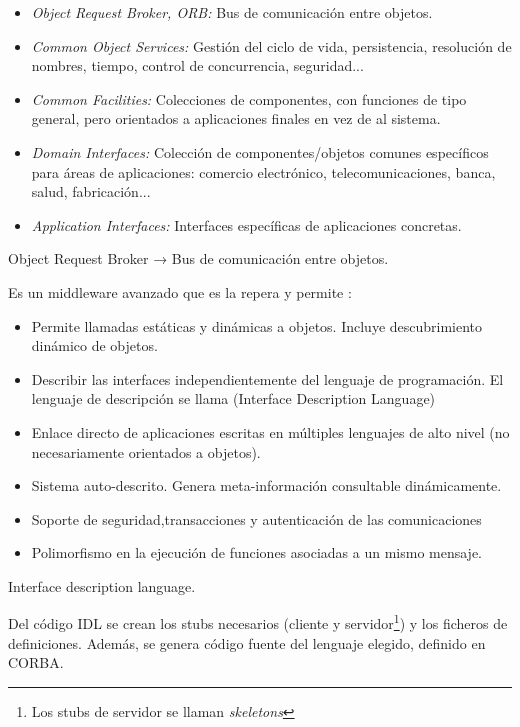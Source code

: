 \begin{itemize}
	\item \textit{Object Request Broker, ORB:} Bus de comunicación entre objetos.
	\item \textit{Common Object Services:} Gestión del ciclo de vida, persistencia, resolución de nombres, tiempo, control de concurrencia, seguridad...
	\item \textit{Common Facilities:} Colecciones de componentes, con funciones de tipo general, pero orientados a aplicaciones finales en vez de al sistema.
	\item \textit{Domain Interfaces:} Colección de componentes/objetos comunes específicos para áreas de aplicaciones: comercio electrónico, telecomunicaciones, banca, salud, fabricación...
	\item \textit{Application Interfaces:} Interfaces específicas de aplicaciones concretas.
\end{itemize}

\begin{defn}[ORB]
Object Request Broker → Bus de comunicación entre objetos.

Es un middleware avanzado que es la repera y permite :

\begin{itemize}
	\item Permite llamadas estáticas y dinámicas a objetos. Incluye descubrimiento dinámico de objetos.
	\item Describir las interfaces independientemente del lenguaje de programación. El lenguaje de descripción se llama \label{IDL} (Interface Description Language)
	\item Enlace directo de aplicaciones escritas en múltiples lenguajes de alto nivel (no necesariamente orientados a objetos).
	\item Sistema auto-descrito. Genera meta-información consultable dinámicamente.
	\item Soporte de seguridad,transacciones y autenticación de las comunicaciones
	\item Polimorfismo en la ejecución de funciones asociadas a un mismo mensaje.
\end{itemize}
\end{defn}

\begin{defn}[IDL]
Interface description language.
\end{defn}

Del código IDL se crean los stubs necesarios (cliente y servidor\footnote{Los stubs de servidor se llaman \textit{skeletons}}) y los ficheros de definiciones. Además, se genera código fuente del lenguaje elegido, definido en CORBA.

